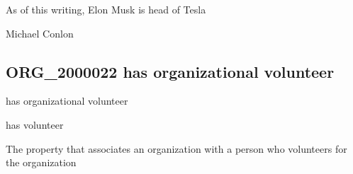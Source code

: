 \documentclass[letterpaper,10pt,english]{sphinxmanual}
\begin{document}
\begin{sphinxShadowBox}

\sphinxAtStartPar
As of this writing, Elon Musk is head of Tesla
\end{sphinxShadowBox}

\begin{sphinxShadowBox}

\sphinxAtStartPar
Michael Conlon 
\end{sphinxShadowBox}
\begin{quote}

\ignorespaces \end{quote}


\subsection{ORG\_2000022 \sphinxhyphen{} has organizational volunteer}
\label{\detokenize{doc-ORG_2000022:org-2000022-has-organizational-volunteer}}\label{\detokenize{doc-ORG_2000022:index-0}}\label{\detokenize{doc-ORG_2000022::doc}}
\begin{sphinxShadowBox}

\sphinxAtStartPar
has organizational volunteer
\end{sphinxShadowBox}

\begin{sphinxShadowBox}

\sphinxAtStartPar
has volunteer
\end{sphinxShadowBox}

\begin{sphinxShadowBox}

\sphinxAtStartPar
{}
\end{sphinxShadowBox}

\begin{sphinxShadowBox}

\sphinxAtStartPar
The property that associates an organization with a person who volunteers for the organization
\end{sphinxShadowBox}
\end{document}
